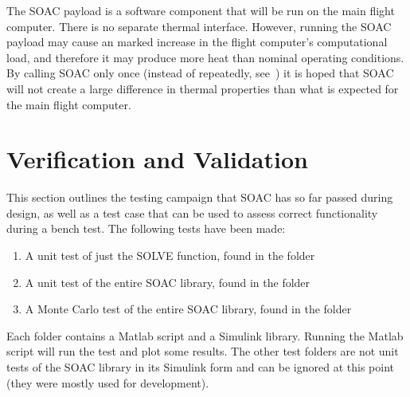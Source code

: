 \documentclass[10pt]{article}
\begin{document}
The SOAC payload is a software component that will be run on the main flight computer. There is no separate thermal interface. However, running the SOAC payload may cause an marked increase in the flight computer's computational load, and therefore it may produce more heat than nominal operating conditions. By calling SOAC only once (instead of repeatedly, see~) it is hoped that SOAC will not create a large difference in thermal properties than what is expected for the main flight computer.

\section{Verification and Validation}\label{sec:v_and_v}

This section outlines the testing campaign that SOAC has so far passed during design, as well as a test case that can be used to assess correct functionality during a bench test. The following tests have been made:
\begin{enumerate}
\item A unit test of just the SOLVE function, found in the folder 
\begin{center}
\end{center}
\item A unit test of the entire SOAC library, found in the folder
\begin{center}
\end{center}
\item A Monte Carlo test of the entire SOAC library, found in the folder
\begin{center}
\end{center}
\end{enumerate}
Each folder contains a Matlab script and a Simulink library. Running the Matlab script will run the test and plot some results. The other test folders are not unit tests of the SOAC library in its Simulink form and can be ignored at this point (they were mostly used for development). 
\end{document}
